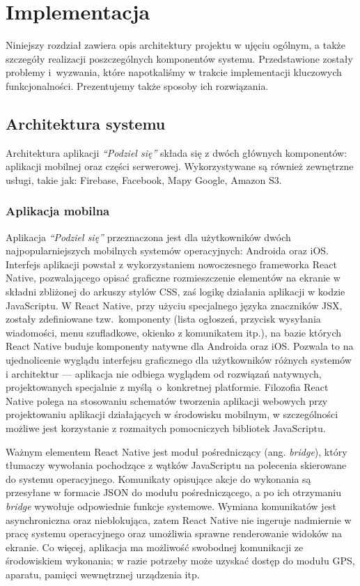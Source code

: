 \documentclass[licencjacka]{pracamgr}
\begin{document}
\chapter{Implementacja}\label{r:arch}

Niniejszy rozdział zawiera opis architektury projektu w ujęciu ogólnym, a także szczegóły realizacji poszczególnych komponentów systemu. Przedstawione zostały problemy i~wyzwania, które napotkaliśmy w trakcie implementacji kluczowych funkcjonalności. Prezentujemy także sposoby ich rozwiązania.

\section{Architektura systemu}
Architektura aplikacji \textit{``Podziel się''} składa się z dwóch głównych komponentów: aplikacji mobilnej oraz części serwerowej. Wykorzystywane są również zewnętrzne usługi, takie jak: Firebase, Facebook, Mapy Google, Amazon S3.

\subsection{Aplikacja mobilna}
Aplikacja \textit{``Podziel się''} przeznaczona jest dla użytkowników dwóch najpopularniejszych mobilnych systemów operacyjnych: Androida oraz iOS\@. Interfejs aplikacji powstał z wykorzystaniem nowoczesnego frameworka React Native, pozwalającego opisać graficzne rozmieszczenie elementów na ekranie w składni zbliżonej do arkuszy stylów CSS, zaś logikę działania aplikacji w kodzie JavaScriptu. W React Native, przy użyciu specjalnego języka znaczników JSX, zostały zdefiniowane tzw.\ komponenty (lista ogłoszeń, przycisk wysyłania wiadomości, menu szufladkowe, okienko z komunikatem itp.), na bazie których React Native buduje komponenty natywne dla Androida oraz iOS\@. Pozwala to na ujednolicenie wyglądu interfejsu graficznego dla użytkowników różnych systemów i architektur --- aplikacja nie odbiega wyglądem od rozwiązań natywnych, projektowanych specjalnie z myślą~o~konkretnej platformie. Filozofia React Native polega na stosowaniu schematów tworzenia aplikacji webowych przy projektowaniu aplikacji działających w środowisku mobilnym, w szczególności możliwe jest korzystanie z rozmaitych pomocniczych bibliotek JavaScriptu.

Ważnym elementem React Native jest moduł pośredniczący (ang. \textit{bridge}), który tłumaczy wywołania pochodzące z wątków JavaScriptu na polecenia skierowane do systemu operacyjnego. Komunikaty opisujące akcje do wykonania są przesyłane w formacie JSON do modułu pośredniczącego, a po ich otrzymaniu \textit{bridge} wywołuje odpowiednie funkcje systemowe. Wymiana komunikatów jest asynchroniczna oraz nieblokująca, zatem React Native nie ingeruje nadmiernie w pracę systemu operacyjnego oraz umożliwia sprawne renderowanie widoków na ekranie. Co więcej, aplikacja ma możliwość swobodnej komunikacji ze środowiskiem wykonania; w razie potrzeby może uzyskać dostęp do modułu GPS, aparatu, pamięci wewnętrznej urządzenia itp.
\end{document}
